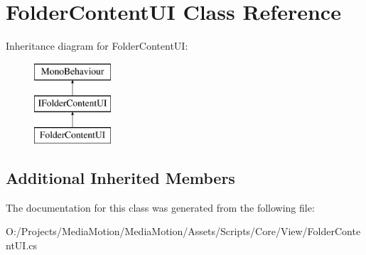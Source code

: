 \hypertarget{class_folder_content_u_i}{\section{Folder\+Content\+U\+I Class Reference}
\label{class_folder_content_u_i}
}
Inheritance diagram for Folder\+Content\+U\+I\+:\begin{figure}[H]
\begin{center}
\leavevmode
\includegraphics[height=3.000000cm]{class_folder_content_u_i}
\end{center}
\end{figure}
\subsection*{Additional Inherited Members}


The documentation for this class was generated from the following file\+:\begin{DoxyCompactItemize}
\item 
O\+:/\+Projects/\+Media\+Motion/\+Media\+Motion/\+Assets/\+Scripts/\+Core/\+View/Folder\+Content\+U\+I.\+cs\end{DoxyCompactItemize}
